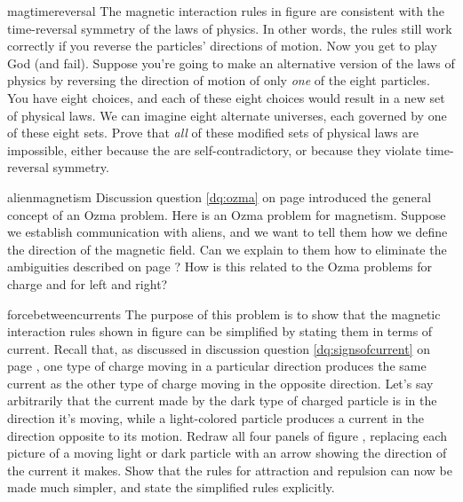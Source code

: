 \begin{hwsection}
\begin{hw}{magtimereversal}
The magnetic interaction rules in figure
 are consistent with the time-reversal symmetry of the laws of
physics. In other words, the rules still work correctly if you reverse the
particles' directions of motion. Now you get to play God (and fail).
Suppose you're going to make an alternative version of the laws of physics
by reversing the direction of motion of only \emph{one} of the eight particles.
You have eight choices, and each of these eight choices would result in a new
set of physical laws. We can imagine eight alternate universes, each governed
by one of these eight sets. Prove that \emph{all} of these modified sets of
physical laws are impossible, either because the are self-contradictory, or
because they violate time-reversal symmetry.
\end{hw}

\begin{hw}{alienmagnetism}
Discussion question \ref{dq:ozma} on page \pageref{dq:ozma} introduced the general
concept of an Ozma problem. Here is an Ozma problem for magnetism. Suppose we establish
communication with aliens, and we want to tell them how we define the direction of the
magnetic field. Can we explain to them how to eliminate the ambiguities 
described on page \pageref{arbitrarydirectionofmag}? How is this related to the
Ozma problems for charge and for left and right?
\end{hw}

\begin{hw}{forcebetweencurrents}
The purpose of this problem is to show that the magnetic interaction rules shown in figure
 can be simplified by stating them in terms of current. 
Recall that, as discussed in discussion question \ref{dq:signsofcurrent} on page
\pageref{dq:signsofcurrent}, one type of charge moving in a particular direction produces
the same current as the other type of charge moving in the opposite direction. 
Let's say arbitrarily that the current made by the dark type of charged particle is
in the direction it's moving, while a light-colored particle produces a current in the
direction opposite to its motion. Redraw all four panels of figure ,
replacing each picture of a moving light or dark particle with an
arrow showing the direction of the current it makes. Show that the rules for attraction and
repulsion can now be made much simpler, and state the simplified rules explicitly.
\end{hw}


\end{hwsection}
